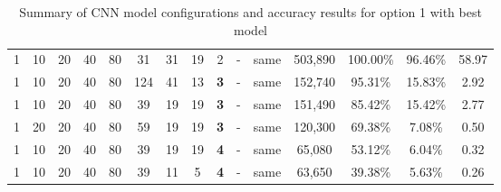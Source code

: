 \begin{table}[ht]
{\begin{tabular}{@{}ccccccccccccccc@{}}
1 & 10 & 20 & 40 & 80 & 31  & 31 & 19 & 2 & -   & same  & 503,890 & 100.00\% & 96.46\% & 58.97 \\
1 & 10 & 20 & 40 & 80 & 124 & 41 & 13 & \textbf{3} & -   & same  & 152,740 & 95.31\%  & 15.83\% & 2.92  \\
1 & 10 & 20 & 40 & 80 & 39  & 19 & 19 & \textbf{3} & -   & same  & 151,490 & 85.42\%  & 15.42\% & 2.77  \\
1 & 20 & 20 & 40 & 80 & 59  & 19 & 19 & \textbf{3} & -   & same  & 120,300 & 69.38\%  & 7.08\%  & 0.50  \\
1 & 10 & 20 & 40 & 80 & 39  & 19 & 19 & \textbf{4} & - & same  & 65,080  & 53.12\%  & 6.04\%  & 0.32  \\
1 & 10 & 20 & 40 & 80 & 39  & 11 & 5  & \textbf{4} & -   & same  & 63,650  & 39.38\%  & 5.63\%  & 0.26  \\ \bottomrule
\end{tabular}}
\caption{Summary of CNN model configurations and accuracy results for option 1 with best model}
\label{tab:cnn_results1}
\end{table}



